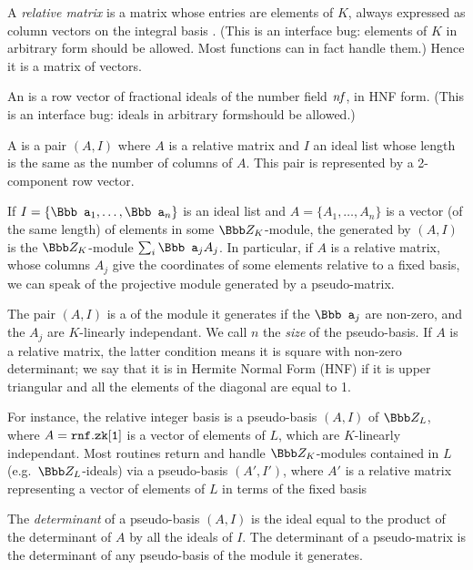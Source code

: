 \item A \emph{relative matrix} is a matrix whose entries are elements of $K$,
always expressed as column vectors on the integral basis .
(This is an interface bug: elements of $K$ in arbitrary form should be allowed.
Most functions can in fact handle them.) Hence it is a matrix of vectors.

\item An  is a row vector of fractional ideals of the number
field $\hbox{\it nf\/}$, in HNF form. (This is an interface bug: ideals in arbitrary
formshould be allowed.)

\item A  is a pair $(A,I)$ where $A$ is a relative matrix
and $I$ an ideal list whose length is the same as the number of columns of
$A$. This pair is represented by a 2-component row vector.

\item If $I = \{{\Bbb a}_1,\dots, {\Bbb a}_n\}$ is an ideal list and $A
= \{A_1,\dots, A_n\}$ is a vector (of the same length) of elements in some
$\Z_K$-module, the  generated by $(A,I)$ is the
$\Z_K$-module $\sum_i {\Bbb a}_j A_j$. In particular, if $A$ is a relative
matrix, whose columns $A_j$ give the coordinates of some elements relative to
a fixed basis, we can speak of the projective module generated by a
pseudo-matrix.

\item The pair $(A,I)$ is a  of the module it
generates if the ${\Bbb a_j}$ are non-zero, and the $A_j$ are $K$-linearly
independant. We call $n$ the \emph{size} of the pseudo-basis. If $A$ is a
relative matrix, the latter condition means it is square with non-zero
determinant; we say that it is in Hermite Normal Form (HNF) if it is upper triangular and all the elements of the diagonal
are equal to 1.

\item For instance, the relative integer basis  is a pseudo-basis
$(A,I)$ of $\Z_L$, where $A = {\tt rnf.zk[1]}$ is a vector of elements of $L$,
which are $K$-linearly independant. Most  routines return and handle
$\Z_K$-modules contained in $L$ (e.g.~$\Z_L$-ideals) via a pseudo-basis
$(A',I')$, where $A'$ is a relative matrix representing a vector of elements of
$L$ in terms of the fixed basis 

\item The \emph{determinant} of a pseudo-basis $(A,I)$ is the ideal
equal to the product of the determinant of $A$ by all the ideals of $I$. The
determinant of a pseudo-matrix is the determinant of any pseudo-basis of the
module it generates.

